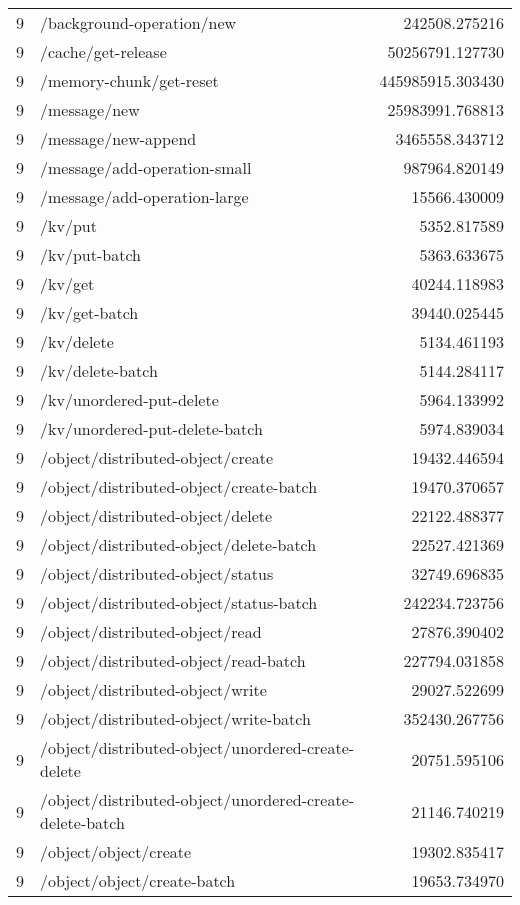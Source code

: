 \begin{longtable}{rlr}
9 & /background-operation/new & 242508.275216 \\
9 & /cache/get-release & 50256791.127730 \\
9 & /memory-chunk/get-reset & 445985915.303430 \\
9 & /message/new & 25983991.768813 \\
9 & /message/new-append & 3465558.343712 \\
9 & /message/add-operation-small & 987964.820149 \\
9 & /message/add-operation-large & 15566.430009 \\
9 & /kv/put & 5352.817589 \\
9 & /kv/put-batch & 5363.633675 \\
9 & /kv/get & 40244.118983 \\
9 & /kv/get-batch & 39440.025445 \\
9 & /kv/delete & 5134.461193 \\
9 & /kv/delete-batch & 5144.284117 \\
9 & /kv/unordered-put-delete & 5964.133992 \\
9 & /kv/unordered-put-delete-batch & 5974.839034 \\
9 & /object/distributed-object/create & 19432.446594 \\
9 & /object/distributed-object/create-batch & 19470.370657 \\
9 & /object/distributed-object/delete & 22122.488377 \\
9 & /object/distributed-object/delete-batch & 22527.421369 \\
9 & /object/distributed-object/status & 32749.696835 \\
9 & /object/distributed-object/status-batch & 242234.723756 \\
9 & /object/distributed-object/read & 27876.390402 \\
9 & /object/distributed-object/read-batch & 227794.031858 \\
9 & /object/distributed-object/write & 29027.522699 \\
9 & /object/distributed-object/write-batch & 352430.267756 \\
9 & /object/distributed-object/unordered-create-delete & 20751.595106 \\
9 & /object/distributed-object/unordered-create-delete-batch & 21146.740219 \\
9 & /object/object/create & 19302.835417 \\
9 & /object/object/create-batch & 19653.734970 \\

\end{longtable}
